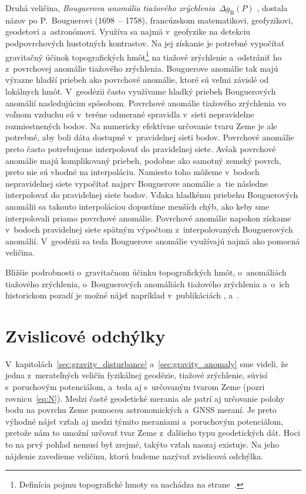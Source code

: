 \documentclass[a4paper, 12pt]{book}
\begin{document}
Druhá veličina, \emph{Bouguerova anomália tiažového zrýchlenia}~$\Delta 
g_{\mathrm{B}}(P)$ \parencite{MoritzPhysicalGeodesy}, dostala názov po 
P.~Bouguerovi (1698~-- 1758), francúzskom matematikovi, geofyzikovi, geodetovi 
a~astronómovi.  Využíva sa najmä v~geofyzike na detekciu podpovrchových 
hustotných kontrastov.  Na jej získanie je potrebné vypočítať gravitačný účinok 
topografických hmôt\footnote{Definícia pojmu topografické hmoty sa nachádza na 
strane~\pageref{def:topographic_masses}.} na tiažové zrýchlenie a~odstrániť ho 
z~povrchovej anomálie tiažového zrýchlenia.  Bouguerove anomálie tak majú 
výrazne hladší priebeh ako povrchové anomálie, ktoré sú veľmi závislé od 
lokálnych hmôt.  V~geodézii často využívame hladký priebeh Bouguerových 
anomálií nasledujúcim spôsobom.  Povrchové anomálie tiažového zrýchlenia vo 
voľnom vzduchu sú v~teréne odmerané spravidla v~sieti nepravidelne 
rozmiestnených bodov.  Na numericky efektívne určovanie tvaru Zeme je ale 
potrebné, aby boli dáta dostupné v~pravidelnej sieti bodov.  Povrchové anomálie 
preto často potrebujeme interpolovať do pravidelnej siete.  Avšak povrchové 
anomálie majú komplikovaný priebeh, podobne ako samotný zemský povrch, preto 
nie sú vhodné na interpoláciu.  Namiesto toho môžeme v~bodoch nepravidelnej 
siete vypočítať najprv Bouguerove anomálie a~tie následne interpolovať do 
pravidelnej siete bodov.  Vďaka hladkému priebehu Bouguerových anomálii sa 
takouto interpoláciou dopustíme menších chýb, ako keby sme interpolovali priamo 
povrchové anomálie.  Povrchové anomálie napokon získame v~bodoch pravidelnej 
siete spätným výpočtom z~interpolovaných Bouguerových anomálií.  V~geodézii sa 
teda Bouguerove anomálie využívajú najmä ako pomocná veličina.

Bližšie podrobnosti o~gravitačnom účinku topografických hmôt, o~anomáliách 
tiažového zrýchlenia, o~Bouguerových anomáliách tiažového zrýchlenia a~o~ich 
historickom pozadí je možné nájsť napríklad v~publikáciách 
\textcite{Meurers2017}, \textcite{Mikuska2017} a~\textcite{Vajda2020}.





\section{Zvislicové odchýlky}
\label{sec:deflections}

V~kapitolách~\ref{sec:gravity_disturbance} a~\ref{sec:gravity_anomaly} sme 
videli, že jedna z~merateľných veličín fyzikálnej geodézie, tiažové zrýchlenie, 
súvisí s~poruchovým potenciálom, a~teda aj s~určovaným tvarom Zeme (pozri 
rovnicu~\ref{eq:N}).  Medzi časté geodetické merania ale patrí aj určovanie 
polohy bodu na povrchu Zeme pomocou astronomických a~GNSS meraní.  Je preto 
výhodné nájsť vzťah aj medzi týmito meraniami a~poruchovým potenciálom, pretože 
nám to umožní určovať tvar Zeme z~ďalšieho typu geodetických dát.  Hoci to na 
prvý pohľad nemusí byť zrejmé, takýto vzťah naozaj existuje.  Na jeho nájdenie 
zavedieme veličinu, ktorú budeme nazývať zvislicová odchýlka.
\end{document}
